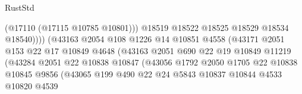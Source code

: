 \begin{lexlean}{RustStd}
\begin{coremodule}
                                              (@17110 (@17115 @10785 @10801)))
                                            @18519
                                            @18522
                                            @18525
                                            @18529
                                            @18534
                                            @18540))))
                                    (@43163
                                      @2054
                                      @108
                                      @1226
                                      @14
                                      @10851
                                      @4558
                                      (@43171
                                        @2051
                                        @153
                                        @22
                                        @17
                                        @10849
                                        @4648
                                        (@43163
                                          @2051
                                          @690
                                          @22
                                          @19
                                          @10849
                                          @11219
                                          (@43284
                                            @2051
                                            @22
                                            @10838
                                            @10847
                                            (@43056
                                              @1792
                                              @2050
                                              @1705
                                              @22
                                              @10838
                                              @10845
                                              @9856
                                              (@43065
                                                @199
                                                @490
                                                @22
                                                @24
                                                @5843
                                                @10837
                                                @10844
                                                @4533
                                                @10820
                                                @4539

\end{coremodule}
\end{lexlean}
